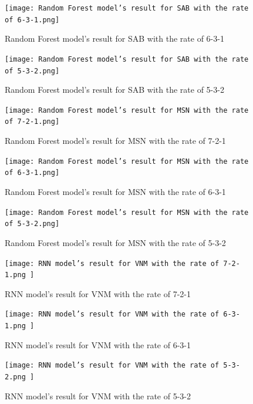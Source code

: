 \documentclass{ieeeojies}
\begin{document}
     \begin{figure}[H]
    \centering
    \begin{minipage}{0.23\textwidth}
    \centering
    \texttt{[image: Random Forest model’s result for SAB with the rate of 6-3-1.png]}
    \caption{Random Forest model’s result for SAB with the rate of 6-3-1}
    \end{minipage}
    \hfill
    \begin{minipage}{0.23\textwidth}
    \centering
    \texttt{[image: Random Forest model’s result for SAB with the rate of 5-3-2.png]}
    \caption{Random Forest model’s result for SAB with the rate of 5-3-2}
    \end{minipage}

    \begin{minipage}{0.23\textwidth}
    \centering
    \texttt{[image: Random Forest model’s result for MSN with the rate of 7-2-1.png]}
    \caption{Random Forest model’s result for MSN with the rate of 7-2-1}
    \end{minipage}
    \hfill
    \begin{minipage}{0.23\textwidth}
    \centering
    \texttt{[image: Random Forest model’s result for MSN with the rate of 6-3-1.png]}
    \caption{Random Forest model’s result for MSN with the rate of 6-3-1}
    \end{minipage}
   \end{figure}

    \begin{figure}[H]
    \centering
    \begin{minipage}{0.23\textwidth}
    \centering
    \texttt{[image: Random Forest model’s result for MSN with the rate of 5-3-2.png]}
    \caption{Random Forest model’s result for MSN with the rate of 5-3-2}
    \end{minipage}
    \begin{minipage}{0.23\textwidth}
    \centering
    \texttt{[image: RNN model’s result for VNM with the rate of 7-2-1.png ]}
    \caption{RNN model’s result for VNM with the rate of 7-2-1}
    \end{minipage}
    \end{figure}

    \begin{figure}[H]
    \begin{minipage}{0.23\textwidth}
    \centering
    \texttt{[image: RNN model’s result for VNM with the rate of 6-3-1.png ]}
    \caption{RNN model’s result for VNM with the rate of 6-3-1}
    \end{minipage}
    \begin{minipage}{0.23\textwidth}
    \centering
    \texttt{[image: RNN model’s result for VNM with the rate of 5-3-2.png ]}
    \caption{RNN model’s result for VNM with the rate of 5-3-2}
    \end{minipage}
    \end{figure}
    
\end{document}

